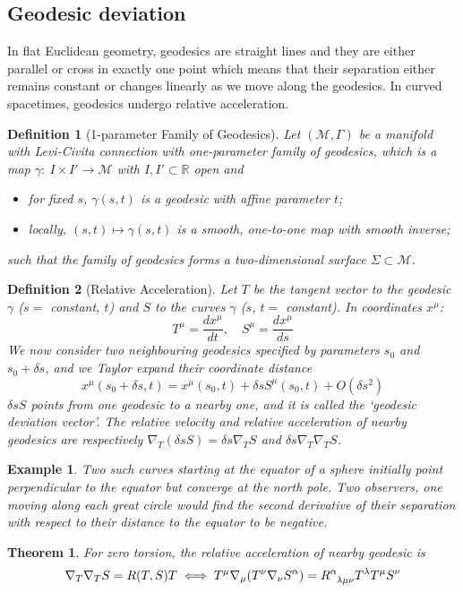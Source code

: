 \documentclass[a4paper]{article}
\newtheorem{eg}{Example}[section]
\theoremstyle{new}
\newtheorem{defi}{Definition}[section]
\newtheorem{thm}{Theorem}[section]
\begin{document}
\subsection{Geodesic deviation}
In flat Euclidean geometry, geodesics are straight lines and they are either parallel or cross in exactly one point which means that their separation either remains constant or changes linearly as we move along the geodesics. In curved spacetimes, geodesics undergo relative acceleration.
\begin{defi}[1-parameter Family of Geodesics]
Let $(\mathcal{M},\Gamma)$ be a manifold with Levi-Civita connection with one-parameter family of geodesics, which is a map $\gamma:~I\times I'\rightarrow\mathcal{M}$ with $I,I'\subset\mathbb{R}$ open and
\begin{itemize}
    \item for fixed $s$, $\gamma(s,t)$ is a geodesic with affine parameter $t$;
    \item locally, $(s,t)\mapsto\gamma(s,t)$ is a smooth, one-to-one map with smooth inverse; 
\end{itemize}
such that the family of geodesics forms a two-dimensional surface $\Sigma\subset\mathcal{M}$.
\end{defi}
\begin{defi}[Relative Acceleration]
Let $T$ be the tangent vector to the geodesic $\gamma$ ($s=$ constant, $t$) and $S$ to the curves $\gamma$ ($s$, $t=$ constant). In coordinates $x^\mu$: $$T^\mu=\frac{dx^\mu}{dt},\quad S^\mu=\frac{dx^\mu}{ds}$$
We now consider two neighbouring geodesics specified by parameters $s_0$ and $s_0+\delta s$, and we Taylor expand their coordinate distance
$$ x^\mu(s_0+\delta s,t)=x^\mu(s_0,t)+\delta sS^\mu(s_0,t)+O(\delta s^2)$$
$\delta sS$ points from one geodesic to a nearby one, and it is called the `geodesic deviation vector'. The relative velocity and relative acceleration of nearby geodesics are respectively $\nabla_T(\delta s S)=\delta s\nabla_TS$ and $\delta s\nabla_T\nabla_TS$.
\end{defi}
\begin{eg}
Two such curves starting at the equator of a sphere initially point perpendicular to the equator but converge at the north pole. Two observers, one moving along each great circle would find the second derivative of their separation with respect to their distance to the equator to be negative.
\end{eg}
\begin{thm}
For zero torsion, the relative acceleration of nearby geodesic is
\begin{equation}
\nabla_T\nabla_TS=R(T,S)T\iff T^\mu\nabla_\mu(T^\nu\nabla_\nu S^\alpha)= \tensor*{R}{*_{}^{\alpha}_{\lambda\mu\nu}}T^\lambda T^\mu S^\nu\label{relativeacceleration}
\end{equation}
\end{thm}
\end{document}
